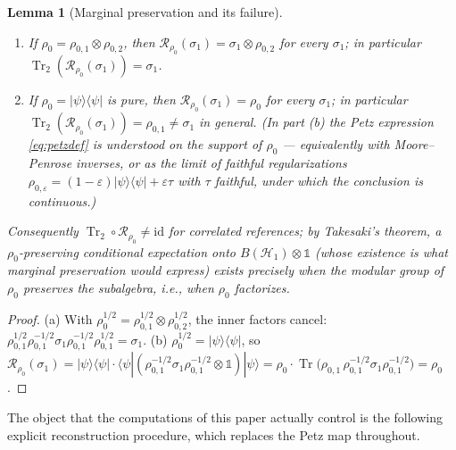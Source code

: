 \documentclass[11pt,a4paper]{article}
\newcommand{\idm}{\mathds{1}}}{\newcommand{\idm}{\mathbf{1}}}
\theoremstyle{plain}
\newtheorem{lemma}[theorem]{Lemma}
\theoremstyle{definition}
\theoremstyle{remark}
\newcommand{\Hh}{\mathcal{H}}
\newcommand{\Tr}{\operatorname{Tr}}
\begin{document}
\begin{lemma}[Marginal preservation and its failure]\label{lem:petzmarginal}
\leavevmode
\begin{enumerate}
\item[(a)] If $\rho_0 = \rho_{0,1} \otimes \rho_{0,2}$, then
$\mathcal{R}_{\rho_0}(\sigma_1) = \sigma_1 \otimes \rho_{0,2}$ for every
$\sigma_1$; in particular $\Tr_2(\mathcal{R}_{\rho_0}(\sigma_1)) = \sigma_1$.
\item[(b)] If $\rho_0 = |\psi\rangle\langle\psi|$ is pure, then
$\mathcal{R}_{\rho_0}(\sigma_1) = \rho_0$ for \emph{every} $\sigma_1$; in
particular $\Tr_2(\mathcal{R}_{\rho_0}(\sigma_1)) = \rho_{0,1} \ne \sigma_1$
in general. (In part (b) the Petz expression \eqref{eq:petzdef} is understood
on the support of $\rho_0$ --- equivalently with Moore--Penrose inverses, or as
the limit of faithful regularizations $\rho_{0,\varepsilon} =
(1-\varepsilon)|\psi\rangle\langle\psi| + \varepsilon\tau$ with $\tau$ faithful,
under which the conclusion is continuous.)
\end{enumerate}
Consequently $\Tr_2 \circ \mathcal{R}_{\rho_0} \ne \mathrm{id}$ for correlated
references; by Takesaki's theorem, a $\rho_0$-preserving conditional expectation
onto $B(\Hh_1)\otimes\idm$ (whose existence is what marginal preservation would
express) exists precisely when the modular group of $\rho_0$ preserves the
subalgebra, i.e., when $\rho_0$ factorizes.
\end{lemma}

\begin{proof}
(a) With $\rho_0^{1/2} = \rho_{0,1}^{1/2} \otimes \rho_{0,2}^{1/2}$, the inner
factors cancel: $\rho_{0,1}^{1/2}\rho_{0,1}^{-1/2}\sigma_1
\rho_{0,1}^{-1/2}\rho_{0,1}^{1/2} = \sigma_1$.
(b) $\rho_0^{1/2} = |\psi\rangle\langle\psi|$, so
$\mathcal{R}_{\rho_0}(\sigma_1) = |\psi\rangle\langle\psi|\cdot
\langle\psi|(\rho_{0,1}^{-1/2}\sigma_1\rho_{0,1}^{-1/2}\otimes\idm)|\psi\rangle
= \rho_0 \cdot \Tr\!\big(\rho_{0,1}\,\rho_{0,1}^{-1/2}\sigma_1
\rho_{0,1}^{-1/2}\big) = \rho_0$.
\end{proof}

The object that the computations of this paper actually control is the following
explicit reconstruction procedure, which replaces the Petz map throughout.
\end{document}
